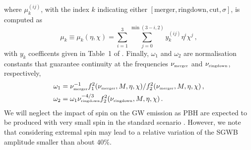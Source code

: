 \documentclass[11pt,a4paper]{article}
\begin{document}
where $\mu^{(ij)}_k$, with the index $k$
indicating either 
$[\text{merger},\text{ringdown},\text{cut},\sigma]$, 
is computed as
\begin{equation}
    \mu_k \equiv \mu_k(\eta,\chi) = \sum_{i=1}^{3} \sum_{j=0}^{\min(3-i,2)} y_k^{(ij)} \eta^i \chi^j \, ,
\end{equation}
with $y_k$ coefficents given in Table~1 of \cite{Ajith:2009bn}.
Finally, $\omega_1$ and $\omega_2$ are normalisation constants that guarantee continuity at the frequencies $\nu_\text{\tiny merger}$ and $\nu_\text{\tiny ringdown}$, respectively,  
\begin{equation}
 \begin{split}
    & \omega_1 = \nu_\text{\tiny merger}^{-1}f_1^2(\nu_\text{\tiny merger}, M, \eta, \chi)/f_2^2(\nu_\text{\tiny merger}, M, \eta, \chi) \, , \\
    & \omega_2 = \omega_1 \nu_\text{\tiny ringdown}^{-4/3} f_2^2(\nu_\text{\tiny ringdown}, M, \eta, \chi)  \, .
 \end{split}
\end{equation}
We will neglect the impact of spin on the GW emission as PBH are expected to be produced with very small spin in the standard scenario \cite{DeLuca:2019buf,Mirbabayi:2019uph}. 
However, we note that considering extremal spin may lead to a relative variation of the SGWB amplitude smaller than about $40\%$.




\end{document}
